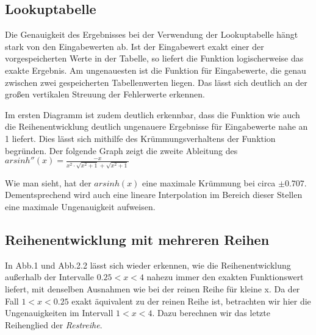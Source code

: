 \documentclass[course=erap] {aspdoc}
\begin{document}
    \subsection{Lookuptabelle}
    Die Genauigkeit des Ergebnisses bei der Verwendung der Lookuptabelle hängt stark von den Eingabewerten ab. Ist der Eingabewert exakt einer der vorgespeicherten Werte in der Tabelle, so liefert die Funktion logischerweise das exakte Ergebnis. Am ungenauesten ist die Funktion für Eingabewerte, die genau zwischen zwei gespeicherten Tabellenwerten liegen. Das lässt sich deutlich an der großen vertikalen Streuung der Fehlerwerte erkennen.
    
    Im ersten Diagramm ist zudem deutlich erkennbar, dass die Funktion wie auch die Reihenentwicklung deutlich ungenauere Ergebnisse für Eingabewerte nahe an 1 liefert. Dies lässt sich mithilfe des Krümmungsverhaltens der Funktion begründen. Der folgende Graph zeigt die zweite Ableitung des $arsinh''(x) = \frac{-x}{x^2\cdot \sqrt{x^2+1}+\sqrt{x^2+1}}$

    

    Wie man sieht, hat der $arsinh(x)$ eine maximale Krümmung bei circa $\pm 0.707$. Dementsprechend wird auch eine lineare Interpolation im Bereich dieser Stellen eine maximale Ungenauigkeit aufweisen.
    


    
    \subsection{Reihenentwicklung mit mehreren Reihen}
    In Abb.1 und Abb.2.2 lässt sich wieder erkennen, wie die Reihenentwicklung außerhalb der Intervalle $0.25<x<4$ nahezu immer den exakten Funktionswert liefert, mit denselben Ausnahmen wie bei der reinen Reihe für kleine x.
    Da der Fall $1<x<0.25$ exakt äquivalent zu der reinen Reihe ist, betrachten wir hier die Ungenauigkeiten im Intervall $1<x<4$. Dazu berechnen wir das letzte Reihenglied der \textit{Restreihe}.
    
\end{document}
